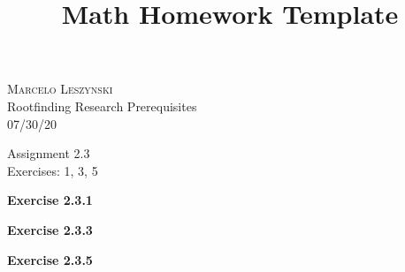 \documentclass[12pt,oneside]{article}
\newenvironment{exercise}[1]{\vspace{.1in}\noindent\textbf{Exercise #1 \hspace{.05em}}}{}
\begin{document}
\title{Math Homework Template}

\begin{flushright}
\textsc{Marcelo Leszynski}  \\
Rootfinding Research Prerequisites\\
07/30/20
\end{flushright}

\begin{center}
\textsf{Assignment 2.3 } \\
\textsf{Exercises: 1, 3, 5 }
\end{center}


\begin{exercise}{2.3.1}

\end{exercise}


\begin{exercise}{2.3.3}

\end{exercise}


\begin{exercise}{2.3.5}

\end{exercise}


\end{document}
